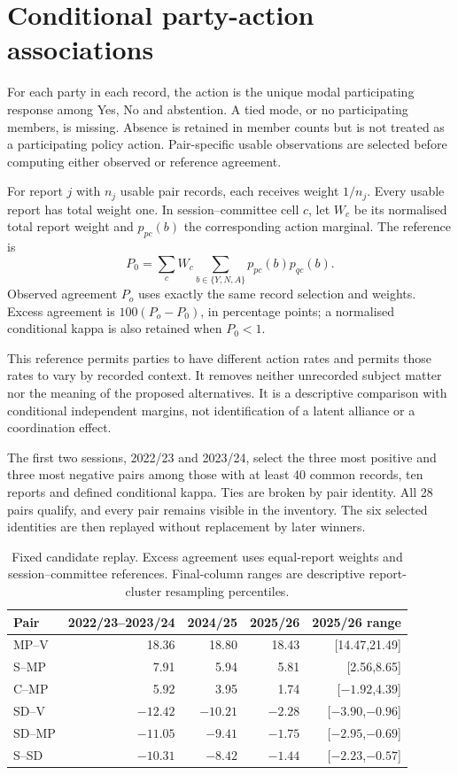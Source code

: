 \section{Conditional party-action associations}

For each party in each record, the action is the unique modal participating response among Yes, No and abstention. A tied mode, or no participating members, is missing. Absence is retained in member counts but is not treated as a participating policy action. Pair-specific usable observations are selected before computing either observed or reference agreement.

For report \(j\) with \(n_j\) usable pair records, each receives weight \(1/n_j\). Every usable report has total weight one. In session--committee cell \(c\), let \(W_c\) be its normalised total report weight and \(p_{pc}(b)\) the corresponding action marginal. The reference is
\[
P_0=\sum_c W_c\sum_{b\in\{Y,N,A\}}p_{pc}(b)p_{qc}(b).
\]
Observed agreement \(P_o\) uses exactly the same record selection and weights. Excess agreement is \(100(P_o-P_0)\), in percentage points; a normalised conditional kappa is also retained when \(P_0<1\).

This reference permits parties to have different action rates and permits those rates to vary by recorded context. It removes neither unrecorded subject matter nor the meaning of the proposed alternatives. It is a descriptive comparison with conditional independent margins, not identification of a latent alliance or a coordination effect.

The first two sessions, 2022/23 and 2023/24, select the three most positive and three most negative pairs among those with at least 40 common records, ten reports and defined conditional kappa. Ties are broken by pair identity. All 28 pairs qualify, and every pair remains visible in the inventory. The six selected identities are then replayed without replacement by later winners.

\begin{table}[htbp]\centering
\caption{Fixed candidate replay. Excess agreement uses equal-report weights and session--committee references. Final-column ranges are descriptive report-cluster resampling percentiles.}
\begin{tabular}{lrrrr}
\toprule
Pair & 2022/23--2023/24 & 2024/25 & 2025/26 & 2025/26 range\\
\midrule
MP--V &18.36&18.80&18.43&[14.47,21.49]\\
S--MP &7.91&5.94&5.81&[2.56,8.65]\\
C--MP &5.92&3.95&1.74&[$-1.92$,4.39]\\
SD--V &$-12.42$&$-10.21$&$-2.28$&[$-3.90$,$-0.96$]\\
SD--MP &$-11.05$&$-9.41$&$-1.75$&[$-2.95$,$-0.69$]\\
S--SD &$-10.31$&$-8.42$&$-1.44$&[$-2.23$,$-0.57$]\\
\bottomrule
\end{tabular}
\end{table}

